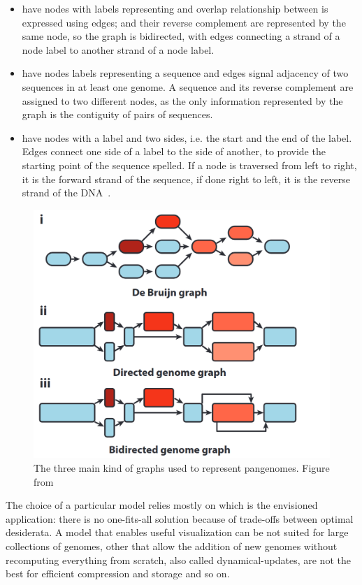 \begin{itemize}[leftmargin=1.8cm]
	\item[{\smash{\stackunder{\textbf{De Bruijn}}{\textbf{graph}}}}] have nodes with labels representing \kmers and overlap relationship between \kmers is expressed using edges; \kmers and their reverse complement are represented by the same node, so the graph is bidirected, with edges connecting a strand of a node label to another strand of a node label.
	\item[{\smash{\stackunder{\textbf{Directed genome}}{\textbf{graph}}}}] have nodes labels representing a sequence and edges signal adjacency of two sequences in at least one genome. A sequence and its reverse complement are assigned to two different nodes, as the only information represented by the graph is the contiguity of pairs of sequences.
	\item[{\smash{\stackunder{\textbf{Bidirected genome}}{\textbf{graph}}}}] have nodes with a label and two sides, i.e. the start and the end of the label. Edges connect one side of a label to the side of another, to provide the starting point of the sequence spelled. If a node is traversed from left to right, it is the forward strand of the sequence, if done right to left, it is the reverse strand of the DNA~\cite{odgi}.
\end{itemize}
\begin{figure}[h!]
	\centering
	\includegraphics[width=.75\linewidth]{figures/background/graph_types.png}
	\caption[Graph pangenome models.]{The three main kind of graphs used to represent pangenomes. Figure from~\cite{eizenga}}
	\label{fig:graph_types.png}
\end{figure}
The choice of a particular model relies mostly on which is the envisioned application: there is no one-fits-all solution because of trade-offs between optimal desiderata. A model that enables useful visualization can be not suited for large collections of genomes, other that allow the addition of new genomes without recomputing everything from scratch, also called dynamical-updates, are not the best for efficient compression and storage and so on.\\
